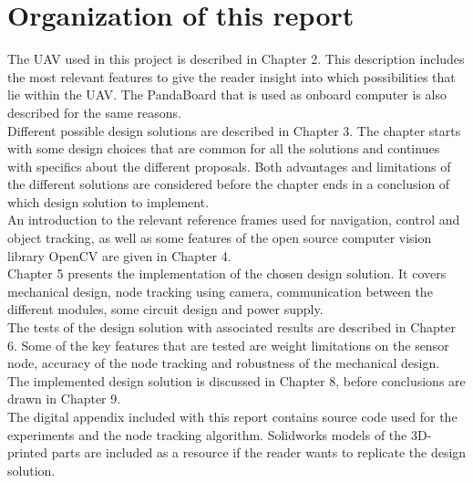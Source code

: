 \section{Organization of this report}
The UAV used in this project is described in Chapter 2. This description includes the most relevant features to give the reader insight into which possibilities that lie within the UAV. The PandaBoard that is used as onboard computer is also described for the same reasons.\\
\newline
Different possible design solutions are described in Chapter 3. The chapter starts with some design choices that are common for all the solutions and continues with specifics about the different proposals. Both advantages and limitations of the different solutions are considered before the chapter ends in a conclusion of which design solution to implement.\\
\newline
An introduction to the relevant reference frames used for navigation, control and object tracking, as well as some features of the open source computer vision library OpenCV are given in Chapter 4.\\
\newline
Chapter 5 presents the implementation of the chosen design solution. It covers mechanical design, node tracking using camera, communication between the different modules, some circuit design and power supply.\\
\newline
The tests of the design solution with associated results are described in Chapter 6. Some of the key features that are tested are weight limitations on the sensor node, accuracy of the node tracking  and robustness of the mechanical design.\\
\newline
The implemented design solution is discussed in Chapter 8, before conclusions are drawn in Chapter 9.\\
\newline
The digital appendix included with this report contains source code used for the experiments and the node tracking algorithm. Solidworks models of the 3D-printed parts are included as a resource if the reader wants to replicate the design solution.